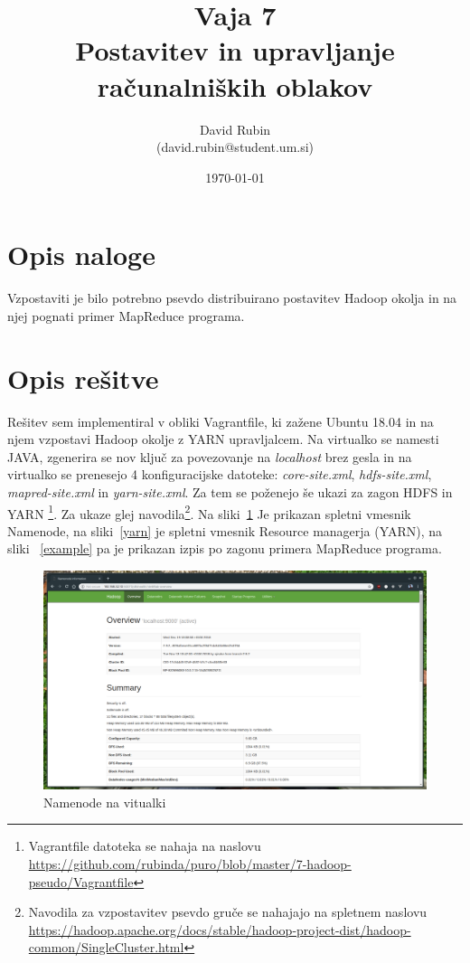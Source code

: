 \documentclass[a4paper,11pt]{article}
\title{%
  Vaja 7\\
  \large Postavitev in upravljanje računalniških oblakov}
\author{David Rubin \\ (david.rubin@student.um.si)}
\date{\today}
\begin{document}
\maketitle

\section{Opis naloge}

Vzpostaviti je bilo potrebno psevdo distribuirano postavitev Hadoop okolja in na njej pognati primer MapReduce programa.

\section{Opis rešitve}

Rešitev sem implementiral v obliki Vagrantfile, ki zažene Ubuntu 18.04 in na njem vzpostavi Hadoop okolje z YARN upravljalcem. Na virtualko se namesti JAVA, zgenerira se nov ključ za povezovanje na \textit{localhost} brez gesla in na virtualko se prenesejo 4 konfiguracijske datoteke: \textit{core-site.xml}, \textit{hdfs-site.xml}, \textit{mapred-site.xml} in \textit{yarn-site.xml}. Za tem se poženejo še ukazi za zagon HDFS in YARN \footnote{Vagrantfile datoteka se nahaja na naslovu \url{https://github.com/rubinda/puro/blob/master/7-hadoop-pseudo/Vagrantfile}}. Za ukaze glej navodila\footnote{Navodila za vzpostavitev psevdo gruče se nahajajo na spletnem naslovu \url{https://hadoop.apache.org/docs/stable/hadoop-project-dist/hadoop-common/SingleCluster.html} }. Na sliki~\ref{namenode} Je prikazan spletni vmesnik Namenode, na sliki~\ref{yarn} je spletni vmesnik Resource managerja (YARN), na sliki ~\ref{example} pa je prikazan izpis po zagonu primera MapReduce programa.


\begin{figure}
\begin{center}
\includegraphics[scale=0.36]{./namenode.png}
\caption{Namenode na vitualki}
\label{namenode}
\end{center}
\end{figure}
\end{document}
